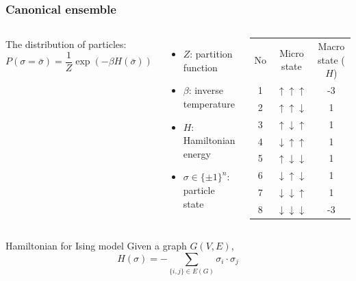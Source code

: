 \documentclass[notheorems]{beamer}
\begin{document}
\begin{frame}
\frametitle{Canonical ensemble}
\begin{columns}
The distribution of particles:
\begin{equation*}
P(\sigma = \bar{\sigma}) = \frac{1}{Z} \exp(-\beta H(\bar{\sigma}))
\end{equation*}
\begin{itemize}
	\item $Z$: partition function
	\item $\beta$: inverse temperature
	\item $H$: Hamiltonian energy
	\item $\sigma \in \{\pm 1\}^n$: particle state 
\end{itemize}
	\begin{tabular}{ccc}
		No & Micro state & Macro state ($H$) \\
		1 & $\uparrow\uparrow\uparrow$ & -3 \\
		2 & $\uparrow\uparrow\downarrow$ & 1 \\
		3 & $\uparrow\downarrow\uparrow$ & 1 \\
		4 & $\downarrow\uparrow\uparrow$ & 1 \\
		5 & $\uparrow\downarrow\downarrow$ & 1 \\
6 & $\downarrow\uparrow\downarrow$ & 1 \\
7 & $\downarrow\downarrow\uparrow$ & 1 \\
8 & $\downarrow\downarrow\downarrow$ & -3 \\
	\end{tabular}
\end{columns}
\begin{block}{Hamiltonian for Ising model}
	Given a graph $G(V, E)$,
	\begin{equation*}
	H(\sigma) = -\sum_{\{i,j\} \in E(G)} \sigma_i \cdot \sigma_j
	\end{equation*}

\end{block}

\end{frame}
\end{document}
